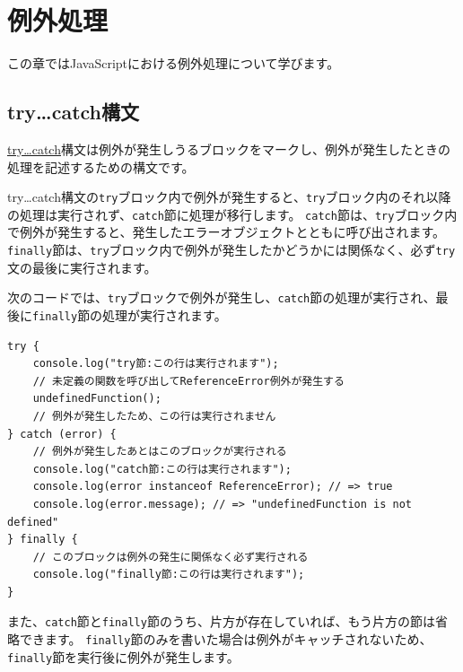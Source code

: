 \hypertarget{error-handling}{%
\chapter{例外処理}\label{error-handling}}
\thispagestyle{frontheadings}

この章ではJavaScriptにおける例外処理について学びます。

\hypertarget{try-catch}{%
\section{try\ldots{}catch構文}\label{try-catch}}

\href{https://developer.mozilla.org/ja/docs/Web/JavaScript/Reference/Statements/try...catch}{try\ldots{}catch}構文は例外が発生しうるブロックをマークし、例外が発生したときの処理を記述するための構文です。

try\ldots{}catch構文の\texttt{try}ブロック内で例外が発生すると、\texttt{try}ブロック内のそれ以降の処理は実行されず、\texttt{catch}節に処理が移行します。
\texttt{catch}節は、\texttt{try}ブロック内で例外が発生すると、発生したエラーオブジェクトとともに呼び出されます。
\texttt{finally}節は、\texttt{try}ブロック内で例外が発生したかどうかには関係なく、必ず\texttt{try}文の最後に実行されます。

次のコードでは、\texttt{try}ブロックで例外が発生し、\texttt{catch}節の処理が実行され、最後に\texttt{finally}節の処理が実行されます。

\begin{lstlisting}
try {
    console.log("try節:この行は実行されます");
    // 未定義の関数を呼び出してReferenceError例外が発生する
    undefinedFunction();
    // 例外が発生したため、この行は実行されません
} catch (error) {
    // 例外が発生したあとはこのブロックが実行される
    console.log("catch節:この行は実行されます");
    console.log(error instanceof ReferenceError); // => true
    console.log(error.message); // => "undefinedFunction is not defined"
} finally {
    // このブロックは例外の発生に関係なく必ず実行される
    console.log("finally節:この行は実行されます");
}
\end{lstlisting}
\newpage
また、\texttt{catch}節と\texttt{finally}節のうち、片方が存在していれば、もう片方の節は省略できます。
\texttt{finally}節のみを書いた場合は例外がキャッチされないため、\texttt{finally}節を実行後に例外が発生します。

